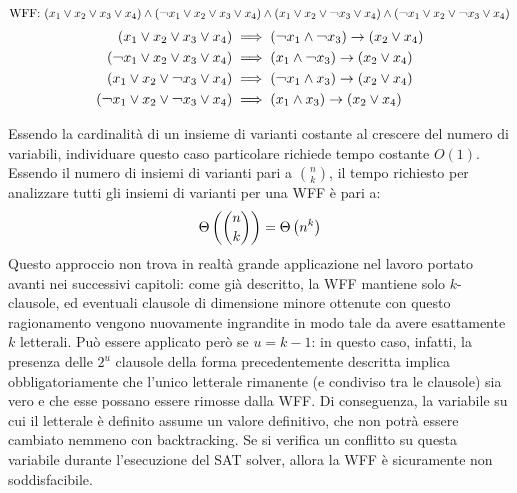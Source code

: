 \begin{exmp}
    \[\textnormal{WFF: } (x_1 \lor x_2 \lor x_3 \lor x_4) \land (\textnormal{¬}x_1 \lor x_2 \lor x_3 \lor x_4) \land (x_1 \lor x_2 \lor \textnormal{¬}x_3 \lor x_4) \land (\textnormal{¬}x_1 \lor x_2 \lor \textnormal{¬}x_3 \lor x_4)\]
    \begin{align*}
        (x_1 \lor x_2 \lor x_3 \lor x_4) &\implies (\textnormal{¬}x_1 \land \textnormal{¬}x_3) \rightarrow (x_2 \lor x_4)\\
        (\textnormal{¬}x_1 \lor x_2 \lor x_3 \lor x_4) &\implies (x_1 \land \textnormal{¬}x_3) \rightarrow (x_2 \lor x_4)\\
        (x_1 \lor x_2 \lor \textnormal{¬}x_3 \lor x_4) &\implies (\textnormal{¬}x_1 \land x_3) \rightarrow (x_2 \lor x_4)\\
        (\textnormal{¬}x_1 \lor x_2 \lor \textnormal{¬}x_3 \lor x_4) &\implies (x_1 \land x_3) \rightarrow (x_2 \lor x_4)
    \end{align*}
\end{exmp}
Essendo la cardinalità di un insieme di varianti costante al crescere del numero di variabili, individuare questo caso particolare richiede tempo costante $O(1)$.
Essendo il numero di insiemi di varianti pari a $\binom{n}{k}$, il tempo richiesto 
per analizzare tutti gli insiemi di varianti per una WFF è pari a:
\begin{equation*}
    \Theta \left(\binom{n}{k}\right) = \Theta \left(n^k\right)
\end{equation*}
Questo approccio non trova in realtà grande applicazione nel lavoro portato avanti nei
successivi capitoli: come già descritto, la WFF mantiene solo $k$-clausole, ed eventuali
clausole di dimensione minore ottenute con questo ragionamento vengono nuovamente ingrandite in modo tale da avere esattamente $k$ 
letterali.
Può essere applicato però se $u = k-1$: in questo caso, infatti, la presenza delle $2^u$ clausole della forma precedentemente descritta implica obbligatoriamente che l'unico letterale rimanente (e condiviso tra le clausole) sia vero e che esse possano essere rimosse dalla WFF.
Di conseguenza, la variabile su cui il letterale è definito assume un valore definitivo, che non potrà essere cambiato nemmeno con backtracking. Se si verifica un conflitto su questa variabile durante l'esecuzione del SAT solver, allora la WFF è sicuramente non soddisfacibile.